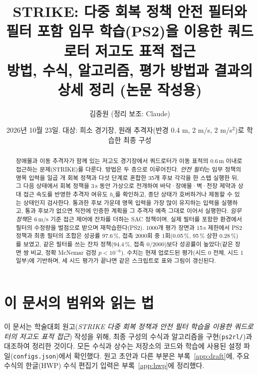 \documentclass[10pt,a4paper]{article}
\title{\vspace{-1.0cm}\textbf{\sffamily STRIKE: 다중 회복 정책 안전 필터와\\ 필터 포함 임무 학습(PS2)을 이용한 쿼드로터 저고도 표적 접근}\\[4pt]
\large 방법, 수식, 알고리즘, 평가 방법과 결과의 상세 정리 (논문 작성용)}
\author{김중원 \quad (정리 보조: Claude)}
\date{\small 2026년 10월 23일. 대상: 희소 경기장, 원래 추격자(반경 0.4 m, 2 m/s, 2 m/s$^2$)로 학습한 최종 구성}
\newcommand{\file}[1]{\texttt{\small #1}}
\begin{document}
\maketitle
\thispagestyle{fancy}

\begin{abstract}
\noindent
장애물과 이동 추격자가 함께 있는 저고도 경기장에서 쿼드로터가 이동 표적의 0.6\,m 이내로 접근하는 문제(STRIKE)를 다룬다.
방법은 두 층으로 이루어진다.
\emph{안전 필터}는 임무 정책의 명목 입력을 일곱 개 회복 정책과 다섯 단계로 혼합한 35개 후보 각각을 한 스텝 실행한 뒤,
그 다음 상태에서 회복 정책을 3\,s 동안 가상으로 전개하여 바닥·장애물·벽·천장 제약과 상대 접근 속도를 반영한 추격자 여유도 $h_c$를 확인하고,
종단 상태가 호버하거나 제동할 수 있는 상태인지 검사한다. 통과한 후보 가운데 명목 입력을 가장 많이 유지하는 입력을 실행하고,
통과 후보가 없으면 직전에 인증한 계획을 그 추격자 예측 그대로 이어서 실행한다.
\emph{임무 정책}은 6\,m/s 기준 접근 제어에 잔차를 더하는 SAC 정책이며, 실제 필터를 포함한 환경에서 필터의 수정량을 벌점으로 받으며 재학습한다(PS2).
1000개 평가 장면과 15\,s 제한에서 PS2 정책과 최종 필터의 조합은 성공률 97.6\,\%, 접촉 2000회 중 1회(0.05\,\%, 95\,\% 상한 0.28\,\%)를 보였고,
같은 필터를 쓰는 잔차 정책(94.4\,\%, 접촉 0/2000)보다 성공률이 높았다(같은 장면 쌍 비교, 정확 McNemar 검정 $p<10^{-6}$).
수치는 현재 업로드된 평가(시드 0 전체, 시드 1 일부)에 기반하며, 세 시드 평가가 끝나면 같은 스크립트로 표와 그림이 갱신된다.
\end{abstract}

\tableofcontents
\vspace{4pt}

\section{이 문서의 범위와 읽는 법}\label{sec:scope}

이 문서는 학술대회 원고(\emph{STRIKE 다중 회복 정책과 안전 필터 학습을 이용한 쿼드로터의 저고도 표적 접근}) 작성을 위해,
최종 구성의 수식과 알고리즘을 구현(\file{ps2rl/})과 대조하여 정리한 것이다.
모든 수식과 상수는 저장소의 코드와 학습에 사용된 설정 파일(\file{configs.json})에서 확인했다.
원고 초안과 다른 부분은 부록~\ref{app:draft}에, 주요 수식의 한글(HWP) 수식 편집기 입력은 부록~\ref{app:hwp}에 정리했다.
\end{document}
